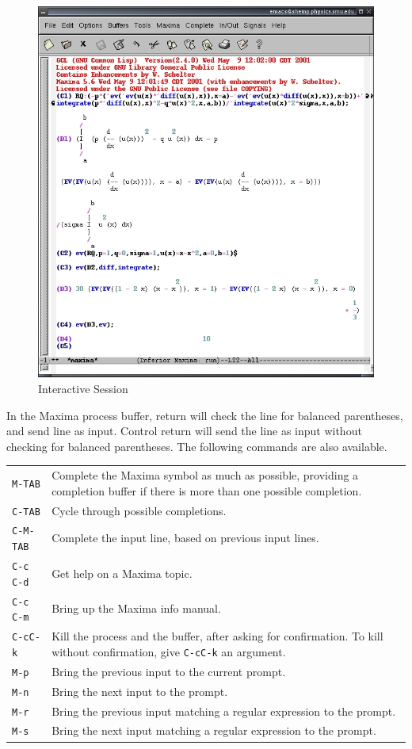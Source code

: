 \begin{figure}
\centering \includegraphics{images/emacsshot}
\caption{Interactive Session}
\end{figure}

In the Maxima process buffer,
return will check the line for balanced parentheses, and send line as input.
Control return will send the line as input without checking for balanced
parentheses.  The following commands are also available.

\smallskip

\begin{tabular}{p{\firstcol}p{\secondcol}}
\texttt{M-TAB} & Complete the Maxima symbol as much as possible, providing
     a completion buffer if there is more than one possible completion.\\
\texttt{C-TAB} & Cycle through possible completions.\\
\texttt{C-M-TAB} & Complete the input line, based on previous input lines.\\
\texttt{C-c C-d} & Get help on a Maxima topic.\\
\texttt{C-c C-m} & Bring up the Maxima info manual.\\
\texttt{C-cC-k} & Kill the process and the buffer, after asking for
  confirmation.  To kill without confirmation, give \texttt{C-cC-k} an
  argument.\\
\texttt{M-p} & Bring the previous input to the current prompt.\\
\texttt{M-n} & Bring the next input to the prompt.\\
\texttt{M-r} & Bring the previous input matching
  a regular expression to the prompt.\\
\texttt{M-s} & Bring the next input matching
  a regular expression to the prompt.
\end{tabular}
